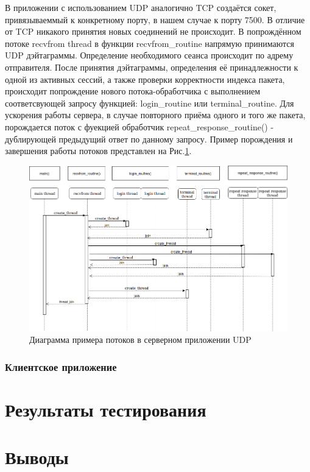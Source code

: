 В приложении с использованием UDP аналогично TCP создаётся сокет, привязываеммый к конкретному порту, в нашем случае к порту 7500. В отличие от TCP никакого принятия новых соединений не происходит. В попрождённом потоке recvfrom thread в функции recvfrom_routine напрямую принимаются UDP дэйтаграммы. Определение необходимого сеанса происходит по адрему отправителя. После принятия дэйтаграммы, определения её принадлежности к одной из активных сессий, а также проверки корректности индекса пакета, происходит попрождение нового потока-обработчика с выполнением соответсвующей запросу функцией: login_routine или terminal_routine. Для ускорения работы сервера, в случае повторного приёма одного и того же пакета, порождается поток с фуекцией обработчик repeat_response_routine() - дублирующей предыдущий ответ по данному запросу. Пример порождения и завершения работы потоков представлен на Рис.\ref{udp_thr}.

\begin{figure}[H]
\centering
\includegraphics[width=1\textwidth]{pics/udpthread.png}
\caption{Диаграмма примера потоков в серверном приложении UDP}
\label{udp_thr}
\end{figure}
\subsubsection{Клиентское приложение}

\section{Результаты тестирования}

\section{Выводы}




